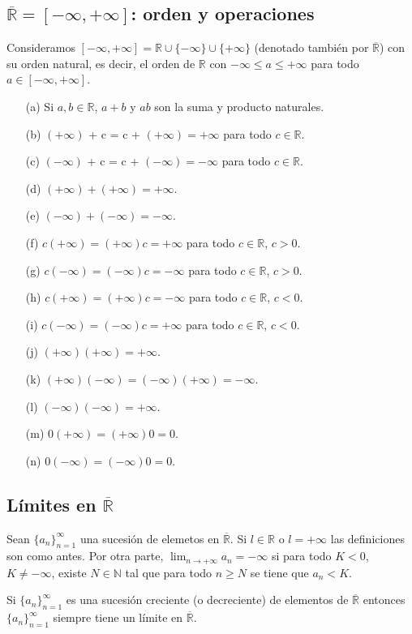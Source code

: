 \subsection{$\overline{\mathbb{R}} = [-\infty,+\infty]$: orden y operaciones}
Consideramos $[-\infty, +\infty] = \mathbb{R} \cup \{ -\infty\} \cup \{+\infty\}$ (denotado también por $\overline{\mathbb{R}}$) con su orden natural, es decir, el orden de $\mathbb{R}$ con $-\infty \leq a \leq +\infty$ para todo $a \in [-\infty, +\infty]$.
\begin{defi}
\begin{enumerate}
    \item[(a)] Si $a,b \in \mathbb{R}$, $a+b$ y $ab$ son la suma y producto naturales.
    \item[(b)] $(+\infty)$ + c = c + $(+\infty) = +\infty$ para todo $c \in \mathbb{R}$.
    \item[(c)] $(-\infty)$ + c = c + $(-\infty) = -\infty$ para todo $c \in \mathbb{R}$.
    \item[(d)] $(+\infty) +  (+ \infty) = +\infty $. 
    \item[(e)] $(-\infty) +  (- \infty) = -\infty $. 
    \item[(f)] $c(+\infty) = (+\infty)c = +\infty$ para todo $c \in \mathbb{R}$, $c > 0$.
    \item[(g)] $c(-\infty) = (-\infty)c = -\infty$ para todo $c \in \mathbb{R}$, $c > 0$.
    \item[(h)] $c(+\infty) = (+\infty)c = -\infty$ para todo $c \in \mathbb{R}$, $c < 0$.
    \item[(i)] $c(-\infty) = (-\infty)c = +\infty$ para todo $c \in \mathbb{R}$, $c < 0$.
    \item[(j)] $(+\infty)(+\infty) = +\infty$.
    \item[(k)] $(+\infty)(-\infty) = (-\infty)(+\infty) = -\infty$.
    \item[(l)] $(-\infty)(-\infty) = +\infty$.
    \item[(m)] $0(+\infty) = (+\infty)0 = 0$.
    \item[(n)] $0(-\infty) = (-\infty)0 = 0$.
\end{enumerate}
\end{defi}

\subsection{Límites en $\overline{\mathbb{R}}$}
\begin{defi}
Sean $\{a_n\}_{n = 1}^{\infty}$ una sucesión de elemetos en $\overline{\mathbb{R}}$. Si $l \in \mathbb{R}$ o $l = +\infty$ las definiciones son como antes. Por otra parte, $\lim_{n \to +\infty}{a_n} = -\infty$ si para todo $K < 0$, $K \not = -\infty$, existe $N \in \mathbb{N}$ tal que para todo $n \ge N$ se tiene que $a_n < K$.
\end{defi}
\begin{obs}
Si $\{a_n\}_{n = 1}^{\infty}$ es una sucesión creciente (o decreciente) de elementos de $\overline{\mathbb{R}}$ entonces $\{a_n\}_{n = 1}^{\infty}$ siempre tiene un límite en $\overline{\mathbb{R}}$.
\end{obs}

